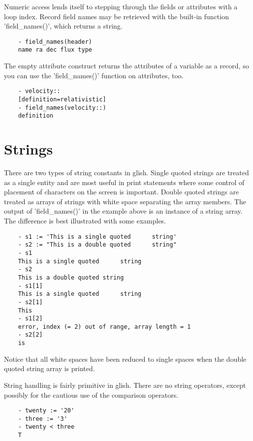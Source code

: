 Numeric access lends itself to stepping through the fields or attributes
with a loop index.  Record field names may be retrieved with the built-in
function 'field\_names()', which returns a string.

\begin{verbatim}
	- field_names(header)
	name ra dec flux type
\end{verbatim}

The empty attribute construct returns the attributes of a variable as a
record, so you can use the 'field\_names()' function on attributes, too.

\begin{verbatim}
	- velocity::
	[definition=relativistic]
	- field_names(velocity::)
	definition
\end{verbatim}


\section{Strings}

    There are two types of string constants in glish.  Single quoted
strings are treated as a single entity and are most useful in print
statements where some control of placement of characters on the screen is
important.  Double quoted strings are treated as arrays of strings with
white space separating the array members.  The output of 'field\_names()' in
the example above is an instance of a string array.  The difference is best
illustrated with some examples.

\begin{verbatim}
	- s1 := 'This is a single quoted      string'
	- s2 := "This is a double quoted      string"
	- s1
	This is a single quoted      string 
	- s2
	This is a double quoted string 
	- s1[1]
	This is a single quoted      string 
	- s2[1]
	This 
	- s1[2]
	error, index (= 2) out of range, array length = 1 
	- s2[2]
	is 
\end{verbatim}

Notice that all white spaces have been reduced to single spaces when the
double quoted string array is printed.

    String handling is fairly primitive in glish.  There are no string
operators, except possibly for the cautious use of the comparison
operators.

\begin{verbatim}
	- twenty := '20'
	- three := '3'
	- twenty < three
	T
\end{verbatim}


